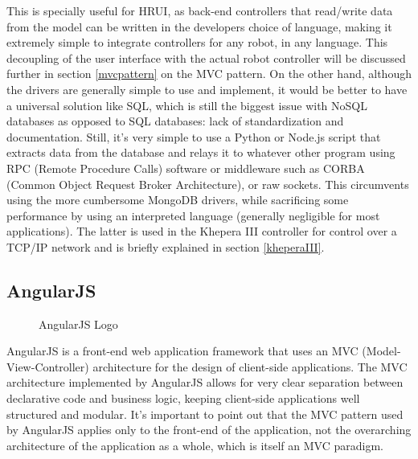 This is specially useful for HRUI, as back-end controllers that read/write data from the model can be written in the developers choice of language, making it extremely simple to integrate controllers for any robot, in any language. This decoupling of the user interface with the actual robot controller will be discussed further in section \ref{mvcpattern} on the MVC pattern. On the other hand, although the drivers are generally simple to use and implement, it would be better to have a universal solution like SQL, which is still the biggest issue with NoSQL databases as opposed to SQL databases: lack of standardization and documentation. Still, it's very simple to use a Python or Node.js script that extracts data from the database and relays it to whatever other program using RPC (Remote Procedure Calls) software or middleware such as CORBA (Common Object Request Broker Architecture), or raw sockets. This circumvents using the more cumbersome MongoDB drivers, while sacrificing some performance by using an interpreted language (generally negligible for most applications). The latter is used in the Khepera III controller for control over a TCP/IP network and is briefly explained in section \ref{kheperaIII}.
\newpage
\subsection{AngularJS} \label{AngularJS}
\begin{figure}[H]
\centering

\caption{AngularJS Logo}
\end{figure}
AngularJS is a front-end web application framework that uses an MVC (Model-View-Controller) architecture for the design of client-side applications. The MVC architecture implemented by AngularJS allows for very clear separation between declarative code and business logic, keeping client-side applications well structured and modular. It's important to point out that the MVC pattern used by AngularJS applies only to the front-end of the application, not the overarching architecture of the application as a whole, which is itself an MVC paradigm.\\

